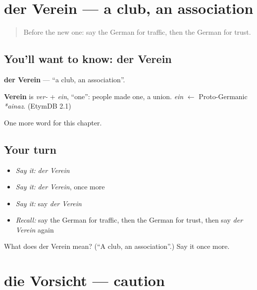 \section[der Verein]{der Verein — a club, an association}

\label{lesson:GE-C242-verein}



\begin{quote}
Before the new one: say the German for traffic, then the German for trust.
\end{quote}

\subsection*{You'll want to know: der Verein}
\textbf{der Verein} — \textquotedblleft{}a club, an association\textquotedblright{}.

\begin{cousinweb}
\textbf{Verein} is \emph{ver-} + \emph{ein}, \textquotedblleft{}one\textquotedblright{}: people made one, a union. \emph{ein} $\leftarrow$ Proto-Germanic \emph{*ainaz}. (EtymDB 2.1)
\end{cousinweb}

\begin{grammarlens}[title={What you've built}]
One more word for this chapter.
\end{grammarlens}

\subsection*{Your turn}
\begin{itemize}
\raggedright
  \item \emph{Say it:} \emph{der Verein}
  \item \emph{Say it:} \emph{der Verein}, once more
  \item \emph{Say it:} say \emph{der Verein}
  \item \emph{Recall:} say the German for traffic, then the German for trust, then say \emph{der Verein} again
\end{itemize}

\begin{tcolorbox}[breakable,colback=teal!4,colframe=teal!35!black,title={Before you move on}]
What does der Verein mean? (\textquotedblleft{}A club, an association\textquotedblright{}.) Say it once more.
\end{tcolorbox}
\section[die Vorsicht]{die Vorsicht — caution}

